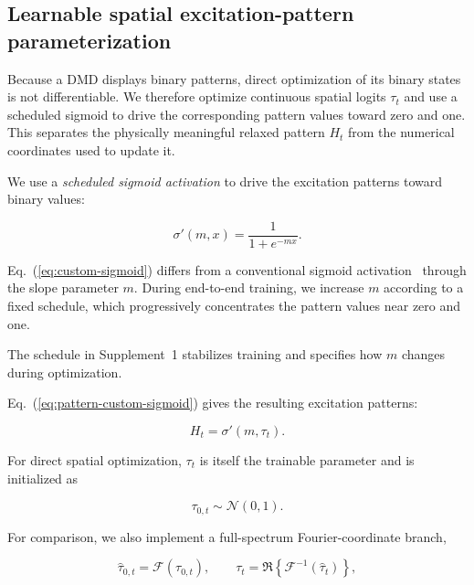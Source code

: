 \documentclass{optica-article}
\begin{document}
\subsection{Learnable spatial excitation-pattern parameterization}
Because a DMD displays binary patterns, direct optimization of its binary states is not differentiable. We therefore optimize continuous spatial logits $\tau_t$ and use a scheduled sigmoid to drive the corresponding pattern values toward zero and one. This separates the physically meaningful relaxed pattern $H_t$ from the numerical coordinates used to update it.

We use a \textit{scheduled sigmoid activation} to drive the excitation patterns toward binary values:

\begin{equation}
    \sigma'(m,x) = \frac{1}{1 + e^{-mx}}.
    \label{eq:custom-sigmoid}
\end{equation}

Eq.~(\ref{eq:custom-sigmoid}) differs from a conventional sigmoid activation~\cite{nwankpa2018activation} through the slope parameter $m$. During end-to-end training, we increase $m$ according to a fixed schedule, which progressively concentrates the pattern values near zero and one.

The schedule in Supplement~1 stabilizes training and specifies how $m$ changes during optimization.

Eq.~(\ref{eq:pattern-custom-sigmoid}) gives the resulting excitation patterns:

\begin{equation}
    H_t = \sigma'(m,\tau_t).
    \label{eq:pattern-custom-sigmoid}
\end{equation}

For direct spatial optimization, $\tau_t$ is itself the trainable parameter and is initialized as

\begin{equation}
    \tau_{0,t} \sim \mathcal{N}(0,1).
    \label{eq:spatial-logit-initialization}
\end{equation}

For comparison, we also implement a full-spectrum Fourier-coordinate branch,

\begin{equation}
    \widehat{\tau}_{0,t}=\mathcal{F}(\tau_{0,t}),
    \qquad
    \tau_t=\Re\!\left\{\mathcal{F}^{-1}(\widehat{\tau}_t)\right\},
    \label{eq:fourier-coordinate-parameterization}
\end{equation}
\end{document}
